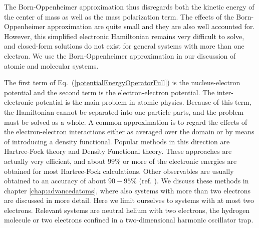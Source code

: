 The Born-Oppenheimer approximation thus disregards both the kinetic
energy of the center of mass as well as the mass polarization term.
The effects of the Born-Oppenheimer approximation are quite small and
they are also well accounted for.
However, this simplified electronic Hamiltonian remains very difficult
to solve, and closed-form solutions do not exist for general systems
with more than one electron. We use the Born-Oppenheimer approximation in our discussion
of atomic and molecular systems. 

The first term of Eq.~(\ref{potentialEnergyOperatorFull}) is the
nucleus-electron potential and the second term is the
electron-electron potential. The inter-electronic potential is the
main problem in atomic physics. Because of this term, the
Hamiltonian cannot be separated into one-particle parts, and the
problem must be solved as a whole. A common approximation is to regard
the effects of the electron-electron interactions either as averaged
over the domain or by means of introducing a density functional. Popular methods
in this direction are
Hartree-Fock theory and Density Functional theory. These
approaches are actually very efficient, and about $99\%$ or more of
the electronic energies are obtained for most Hartree-Fock calculations.
Other observables are usually obtained to an accuracy of about
$90-95\%$ (ref. \cite{abinitio}).  We discuss these methods in chapter \ref{chap:advancedatoms}, where also systems with more than two electrons are discussed
in more detail. Here we limit ourselves to systems with at most two electrons.  Relevant systems are neutral helium with two electrons, the hydrogen molecule or two electrons confined in a two-dimensional harmonic oscillator trap.  



